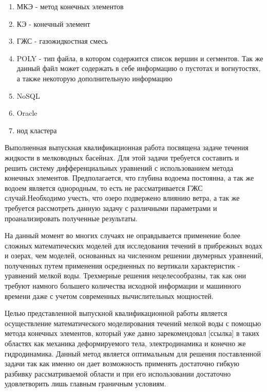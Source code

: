 \documentclass[14pt]{extreport}
\begin{document}


\tableofcontents

\abbreviations

\begin{enumerate}
\item МКЭ - метод конечных элементов
\item КЭ - конечный элемент
\item ГЖС - газожидкостная смесь
\item POLY - тип файла, в котором содержится список вершин и сегментов. Так же данный файл может содержать в себе информацию о пустотах и вогнутостях, а также некоторую дополнительную информацию\cite{bib:website:poly}
\item NoSQL
\item Oracle
\item нод кластера
\end{enumerate}

\intro

Выполненная выпускная квалификационная работа посвящена задаче течения жидкости в мелководных басейнах. Для этой задачи требуется составить и решить систему дифференциальных уравнений с использованием метода конечных элементов. Предполагается, что глубина водоема постоянна, а так же водоем является однородным, то есть не рассматривается ГЖС случай.Необходимо учесть, что озеро подвержено влиянию ветра, а так же требуется рассмотреть данную задачу с различными параметрами и проанализировать полученные результаты.

На данный момент во многих случаях не оправдывается применение более сложных математических моделей для исследования течений в прибрежных водах и озерах, чем моделей, основанных на численном решении двумерных уравнений, полученных путем применения осредненных по вертикали характеристик - уравнений мелкой воды. Трехмерные решения нецелесообразны, так как они требуют намного большего количества исходной информации и машинного времени даже с учетом современных вычислительных мощностей.

Целью представленной выпускной квалификационной работы является осуществление математического моделирования течений мелкой воды с помощью метода конечных элементов, который уже давно зарекомендовал [ссылка] в таких областях как механика деформируемого тела, электродинамика и конечно же гидродинамика. Данный метод является оптимальным для решения поставленной задачи так как именно он дает возможность применять достаточно гибкую разбивку рассматриваемой области и при его использовании достаточно удовлетворить лишь главным граничным условиям.
\end{document}
